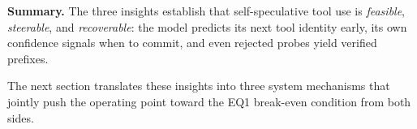 \medskip
\begin{tcolorbox}[
  colback=blue!3!white,
  colframe=blue!45!black,
  boxrule=0.45pt,
  arc=1.5pt,
  left=4pt,
  right=4pt,
  top=3pt,
  bottom=3pt
]
\textbf{Summary.}
The three insights establish that self-speculative tool use is \emph{feasible},
\emph{steerable}, and \emph{recoverable}: the model predicts its next tool identity
early, its own confidence signals when to commit, and even rejected probes yield
verified prefixes.
\end{tcolorbox}

\noindent The next section translates these insights into three system mechanisms that
jointly push the operating point toward the EQ1 break-even condition from both sides.

